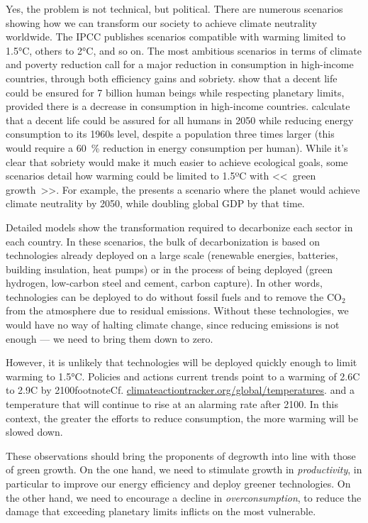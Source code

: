 \documentclass[a5paper,french,openany]{memoir}
\begin{document}
Yes, the problem is not technical, but political. There are numerous scenarios showing how we can transform our society to achieve climate neutrality worldwide. The IPCC publishes scenarios compatible with warming limited to 1.5°C, others to 2°C, and so on. The most ambitious scenarios in terms of climate and poverty reduction call for a major reduction in consumption in high-income countries, through both efficiency gains and sobriety. \cite{oneill_good_2018,hickel_is_2019} show that a decent life could be ensured for 7 billion human beings while respecting planetary limits, provided there is a decrease in consumption in high-income countries. \cite{millward-hopkins_providing_2020} calculate that a decent life could be assured for all humans in 2050 while reducing energy consumption to its 1960s level, despite a population three times larger (this would require a 60~\% reduction in energy consumption per human). While it's clear that sobriety would make it much easier to achieve ecological goals, some scenarios detail how warming could be limited to 1.5ºC with <<~green growth~>>. For example, the \cite{agence_internationale_de_lenergie_net_2023} presents a scenario where the planet would achieve climate neutrality by 2050, while doubling global GDP by that time. 

Detailed models show the transformation required to decarbonize each sector in each country. In these scenarios, the bulk of decarbonization is based on technologies already deployed on a large scale (renewable energies, batteries, building insulation, heat pumps) or in the process of being deployed (green hydrogen, low-carbon steel and cement, carbon capture). In other words, technologies can be deployed to do without fossil fuels and to remove the CO$_\text{2}$ from the atmosphere due to residual emissions. Without these technologies, we would have no way of halting climate change, since reducing emissions is not enough --- we need to bring them down to zero. 

However, it is unlikely that technologies will be deployed quickly enough to limit warming to 1.5°C. Policies and actions 
current trends point to a warming of 2.6\textdegree{}C to 2.9\textdegree{}C by 2100footnote{Cf. \href{https://climateactiontracker.org/global/temperatures/}{climateactiontracker.org/global/temperatures}.} and a temperature that will continue to rise at an alarming rate after 2100. In this context, the greater the efforts to reduce consumption, the more warming will be slowed down. 

These observations should bring the proponents of degrowth into line with those of green growth. On the one hand, we need to stimulate growth in \textit{productivity}, in particular to improve our energy efficiency and deploy greener technologies. On the other hand, we need to encourage a decline in \textit{overconsumption}, to reduce the damage that exceeding planetary limits inflicts on the most vulnerable. 
\end{document}
